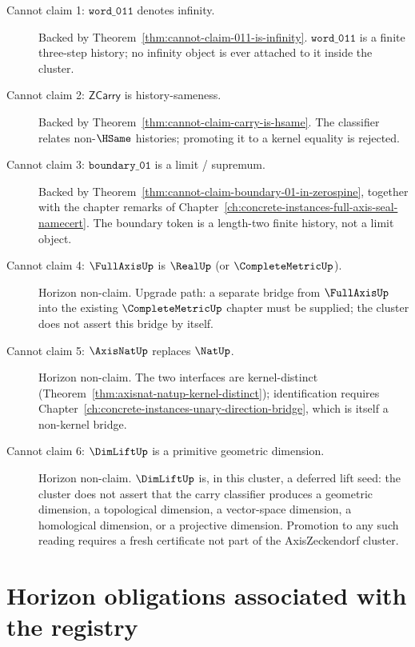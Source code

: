 \begin{description}
\item[Cannot claim 1: \(\mathtt{word\_011}\) denotes infinity.]
  Backed by Theorem~\ref{thm:cannot-claim-011-is-infinity}. \(\mathtt{word\_011}\) is a finite three-step history; no infinity object is ever attached to it inside the cluster.

\item[Cannot claim 2: \(\mathsf{ZCarry}\) is history-sameness.]
  Backed by Theorem~\ref{thm:cannot-claim-carry-is-hsame}. The classifier relates non-\(\HSame\) histories; promoting it to a kernel equality is rejected.

\item[Cannot claim 3: \(\mathtt{boundary\_01}\) is a limit / supremum.]
  Backed by Theorem~\ref{thm:cannot-claim-boundary-01-in-zerospine}, together with the chapter remarks of Chapter~\ref{ch:concrete-instances-full-axis-seal-namecert}. The boundary token is a length-two finite history, not a limit object.

\item[Cannot claim 4: \(\FullAxisUp\) is \(\RealUp\) (or \(\CompleteMetricUp\)).]
  Horizon non-claim. Upgrade path: a separate bridge from \(\FullAxisUp\) into the existing \(\CompleteMetricUp\) chapter must be supplied; the cluster does not assert this bridge by itself.

\item[Cannot claim 5: \(\AxisNatUp\) replaces \(\NatUp\).]
  Horizon non-claim. The two interfaces are kernel-distinct (Theorem~\ref{thm:axisnat-natup-kernel-distinct}); identification requires Chapter~\ref{ch:concrete-instances-unary-direction-bridge}, which is itself a non-kernel bridge.

\item[Cannot claim 6: \(\DimLiftUp\) is a primitive geometric dimension.]
  Horizon non-claim. \(\DimLiftUp\) is, in this cluster, a deferred lift seed: the cluster does not assert that the carry classifier produces a geometric dimension, a topological dimension, a vector-space dimension, a homological dimension, or a projective dimension. Promotion to any such reading requires a fresh certificate not part of the AxisZeckendorf cluster.
\end{description}

\section{Horizon obligations associated with the registry}

